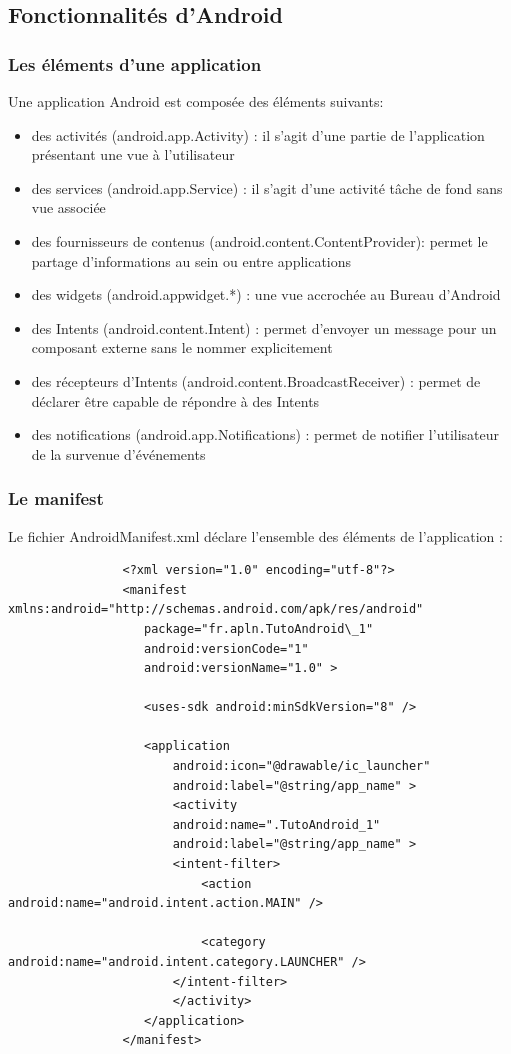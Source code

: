 \documentclass[a4paper]{report}
\begin{document}
		\subsection{Fonctionnalités d’Android}
			\subsubsection{Les éléments d’une application}
				Une application Android est composée des éléments suivants:\\
				\begin{itemize}
					\item des activités (android.app.Activity) : il s'agit d'une partie de l'application présentant une vue à l'utilisateur
					\item des services (android.app.Service) : il s'agit d'une activité tâche de fond sans vue associée
					\item des fournisseurs de contenus (android.content.ContentProvider): permet le partage d'informations au sein ou entre applications
					\item des widgets (android.appwidget.*) : une vue accrochée au Bureau d'Android
					\item des Intents (android.content.Intent) : permet d'envoyer un message pour un composant externe sans le nommer explicitement
					\item des récepteurs d'Intents (android.content.BroadcastReceiver) : permet de déclarer être capable de répondre à des Intents
					\item des notifications (android.app.Notifications) : permet de notifier l'utilisateur de la survenue d'événements
				\end{itemize}
			
			\subsubsection{Le manifest}
				Le fichier AndroidManifest.xml déclare l'ensemble des éléments de l'application :\\
				\begin{verbatim}
				<?xml version="1.0" encoding="utf-8"?>
				<manifest xmlns:android="http://schemas.android.com/apk/res/android"
				   package="fr.apln.TutoAndroid\_1"
				   android:versionCode="1"
				   android:versionName="1.0" >

				   <uses-sdk android:minSdkVersion="8" />

				   <application
				       android:icon="@drawable/ic_launcher"
				       android:label="@string/app_name" >
				       <activity
					   android:name=".TutoAndroid_1"
					   android:label="@string/app_name" >
					   <intent-filter>
					       <action android:name="android.intent.action.MAIN" />
						
					       <category android:name="android.intent.category.LAUNCHER" />
					   </intent-filter>
				       </activity>
				   </application>
				</manifest>
				\end{verbatim}
\end{document}

